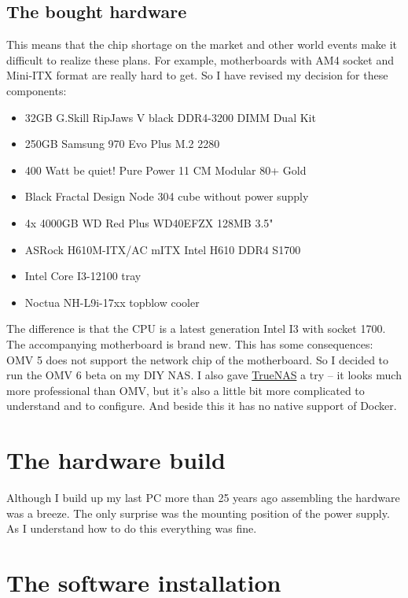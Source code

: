 \subsection{The bought hardware}


This means that the chip shortage on the market and other world events make
it difficult to realize these plans. For example, motherboards with AM4 socket
and Mini-ITX format are really hard to get. So I have revised my decision for
these components:

\begin{itemize}
    \item 32GB G.Skill RipJaws V black DDR4-3200 DIMM Dual Kit
    \item 250GB Samsung 970 Evo Plus M.2 2280
    \item 400 Watt be quiet! Pure Power 11 CM Modular 80+ Gold
    \item Black Fractal Design Node 304 cube without power supply
    \item 4x 4000GB WD Red Plus WD40EFZX 128MB 3.5"
    \item ASRock H610M-ITX/AC mITX Intel H610 DDR4 S1700
    \item Intel Core I3-12100 tray
    \item Noctua NH-L9i-17xx topblow cooler
\end{itemize}

The difference is that the CPU is a latest generation Intel I3 with socket
1700. The accompanying motherboard is brand new. This has some consequences:
\gls{OMV} 5 does not support the network chip of the motherboard. So I decided
to run the \gls{OMV} 6 beta on my DIY \gls{NAS}. I also gave
\href{https://www.truenas.com/}{TrueNAS} a try -- it looks much more
professional than OMV, but it's also a little bit more complicated to
understand and to configure. And beside this it has no native support of
\gls{Docker}.

\section{The hardware build}

Although I build up my last PC more than 25 years ago assembling the
hardware was a breeze. The only surprise was the mounting position of the
power supply. As I understand how to do this everything was fine.

\section{The software installation}

